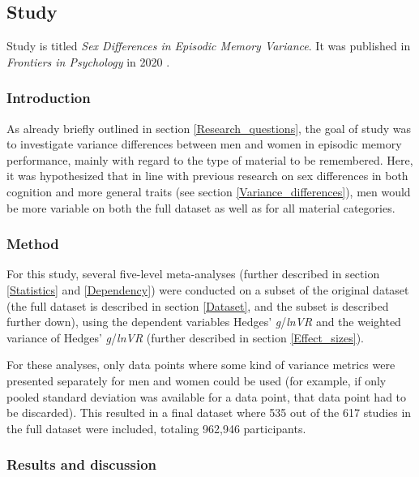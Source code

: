 \subsection{Study } \label{Variance_study}

Study  is titled \emph{Sex Differences in Episodic Memory Variance}. It was published in \emph{Frontiers in Psychology} in 2020 \parencite{Asperholm2020}.

\subsubsection{Introduction}

As already briefly outlined in section \ref{Research_questions}, the goal of study  was to investigate variance differences between men and women in episodic memory performance, mainly with regard to the type of material to be remembered. Here, it was hypothesized that in line with previous research on sex differences in both cognition and more general traits (see section \ref{Variance_differences}), men would be more variable on both the full dataset as well as for all material categories.

\subsubsection{Method}

For this study, several five-level meta-analyses (further described in section \ref{Statistics} and \ref{Dependency}) were conducted on a subset of the original dataset (the full dataset is described in section \ref{Dataset}, and the subset is described further down), using the dependent variables Hedges' \emph{g}/\emph{lnVR} and the weighted variance of Hedges' \emph{g}/\emph{lnVR} (further described in section \ref{Effect_sizes}).

For these analyses, only data points where some kind of variance metrics were presented separately for men and women could be used (for example, if only pooled standard deviation was available for a data point, that data point had to be discarded). This resulted in a final dataset where 535 out of the 617 studies in the full dataset were included, totaling 962,946 participants.

\subsubsection{Results and discussion}

